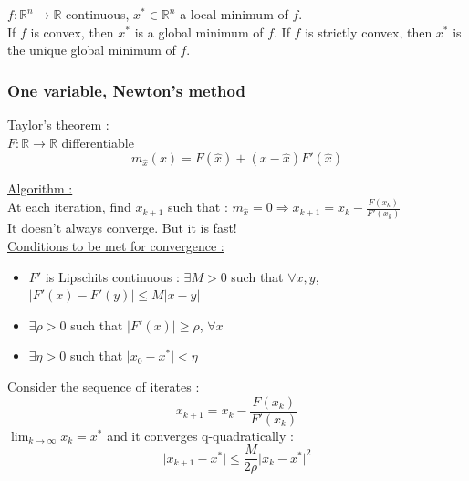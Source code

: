 \documentclass[../main.tex]{subfiles}
\begin{document}
\begin{theoremen}
    $f : \mathbb{R}^n \rightarrow \mathbb{R}$ continuous, $x^* \in \mathbb{R}^n$ a local minimum of $f$.\\
    If $f$ is convex, then $x^*$ is a global minimum of $f$. If $f$ is strictly convex, then $x^*$ is the unique global minimum of $f$.\\
\end{theoremen}

\subsubsection{One variable, Newton's method}

\quad \underline{Taylor's theorem :}\\
$F : \mathbb{R} \rightarrow \mathbb{R}$ differentiable\\
\begin{equation}
    m_{\hat{x}}(x) = F(\hat{x}) + (x-\hat{x})F'(\hat{x})
\end{equation}

\quad \underline{Algorithm :}\\
At each iteration, find $x_{k+1}$ such that : $m_{\hat{x}} = 0 \Rightarrow x_{k+1} = x_k - \frac{F(x_k)}{F'(x_k)}$\\

\warning It doesn't always converge. But it is fast!\\

\quad \underline{Conditions to be met for convergence :}\\
\begin{itemize}
    \item $F'$ is Lipschits continuous : $\exists M>0$ such that $\forall x,y$, $\lvert F'(x) - F'(y) \rvert \leq M\lvert x-y\rvert$\\
    \item $\exists \rho >0$ such that $\lvert F'(x)\rvert \geq \rho$, $\forall x$\\
    \item $\exists \eta>0$ such that $\lvert x_0 - x^*\rvert < \eta$\\
\end{itemize}

\begin{theoremen}
    Consider the sequence of iterates : \begin{equation}
        x_{k+1} = x_k - \frac{F(x_k)}{F'(x_k)}
    \end{equation}
    $\lim_{k\rightarrow \infty} x_k = x^*$ and it converges q-quadratically : \begin{equation}
        \lvert x_{k+1} - x^*\rvert \leq \frac{M}{2\rho} \lvert x_k - x^*\rvert^2
    \end{equation}
\end{theoremen}
\end{document}
